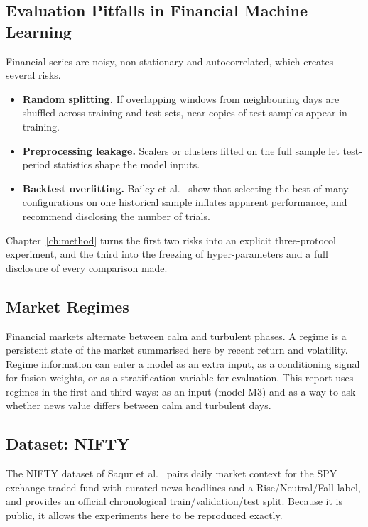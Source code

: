 \subsection{Evaluation Pitfalls in Financial Machine Learning}
Financial series are noisy, non-stationary and autocorrelated, which creates several risks.
\begin{itemize}
\item \textbf{Random splitting.} If overlapping windows from neighbouring days are shuffled across training and test sets, near-copies of test samples appear in training.
\item \textbf{Preprocessing leakage.} Scalers or clusters fitted on the full sample let test-period statistics shape the model inputs.
\item \textbf{Backtest overfitting.} Bailey et al.\ \cite{bailey2014,bailey2015} show that selecting the best of many configurations on one historical sample inflates apparent performance, and recommend disclosing the number of trials.
\end{itemize}
Chapter~\ref{ch:method} turns the first two risks into an explicit three-protocol experiment, and the third into the freezing of hyper-parameters and a full disclosure of every comparison made.

\subsection{Market Regimes}
Financial markets alternate between calm and turbulent phases. A regime is a persistent state of the market summarised here by recent return and volatility. Regime information can enter a model as an extra input, as a conditioning signal for fusion weights, or as a stratification variable for evaluation. This report uses regimes in the first and third ways: as an input (model M3) and as a way to ask whether news value differs between calm and turbulent days.

\subsection{Dataset: NIFTY}
The NIFTY dataset of Saqur et al.\ \cite{saqur2024} pairs daily market context for the SPY exchange-traded fund with curated news headlines and a Rise/Neutral/Fall label, and provides an official chronological train/validation/test split. Because it is public, it allows the experiments here to be reproduced exactly.

